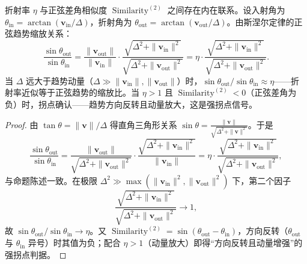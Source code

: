\begin{proposition}[折射率的相位解释]\label{prop:refraction_phase}
折射率 $\eta$ 与正弦差角相似度 $\operatorname{Similarity}^{(2)}$ 之间存在内在联系。设入射角为 $\theta_{\text{in}} = \arctan(\mathbf{v}_{\text{in}}/\Delta)$，折射角为 $\theta_{\text{out}} = \arctan(\mathbf{v}_{\text{out}}/\Delta)$。由斯涅尔定律的正弦趋势缩放关系：
\[
\frac{\sin\theta_{\text{out}}}{\sin\theta_{\text{in}}} = \frac{\|\mathbf{v}_{\text{out}}\|}{\|\mathbf{v}_{\text{in}}\|} \cdot \frac{\sqrt{\Delta^2 + \|\mathbf{v}_{\text{in}}\|^2}}{\sqrt{\Delta^2 + \|\mathbf{v}_{\text{out}}\|^2}} = \eta \cdot \frac{\sqrt{\Delta^2 + \|\mathbf{v}_{\text{in}}\|^2}}{\sqrt{\Delta^2 + \|\mathbf{v}_{\text{out}}\|^2}}.
\]
当 $\Delta$ 远大于趋势动量（$\Delta \gg \|\mathbf{v}_{\text{in}}\|, \|\mathbf{v}_{\text{out}}\|$）时，$\sin\theta_{\text{out}}/\sin\theta_{\text{in}} \approx \eta$——折射率近似等于正弦趋势的缩放比。当 $\eta > 1$ 且 $\operatorname{Similarity}^{(2)} < 0$（正弦差角为负）时，拐点确认——趋势方向反转且动量放大，这是强拐点信号。
\end{proposition}

\begin{proof}
由 $\tan\theta = \|\mathbf{v}\|/\Delta$ 得直角三角形关系 $\sin\theta = \frac{\|\mathbf{v}\|}{\sqrt{\Delta^2 + \|\mathbf{v}\|^2}}$。于是
\[
\frac{\sin\theta_{\text{out}}}{\sin\theta_{\text{in}}}
= \frac{\|\mathbf{v}_{\text{out}}\|}{\sqrt{\Delta^2 + \|\mathbf{v}_{\text{out}}\|^2}} \cdot \frac{\sqrt{\Delta^2 + \|\mathbf{v}_{\text{in}}\|^2}}{\|\mathbf{v}_{\text{in}}\|}
= \eta \cdot \frac{\sqrt{\Delta^2 + \|\mathbf{v}_{\text{in}}\|^2}}{\sqrt{\Delta^2 + \|\mathbf{v}_{\text{out}}\|^2}},
\]
与命题陈述一致。在极限 $\Delta^2 \gg \max(\|\mathbf{v}_{\text{in}}\|^2, \|\mathbf{v}_{\text{out}}\|^2)$ 下，第二个因子
\[
\frac{\sqrt{\Delta^2 + \|\mathbf{v}_{\text{in}}\|^2}}{\sqrt{\Delta^2 + \|\mathbf{v}_{\text{out}}\|^2}} \to 1,
\]
故 $\sin\theta_{\text{out}}/\sin\theta_{\text{in}} \to \eta$。又 $\operatorname{Similarity}^{(2)} = \sin(\theta_{\text{out}} - \theta_{\text{in}})$，方向反转（$\theta_{\text{out}}$ 与 $\theta_{\text{in}}$ 异号）时其值为负；配合 $\eta > 1$（动量放大）即得“方向反转且动量增强”的强拐点判据。
\end{proof}

